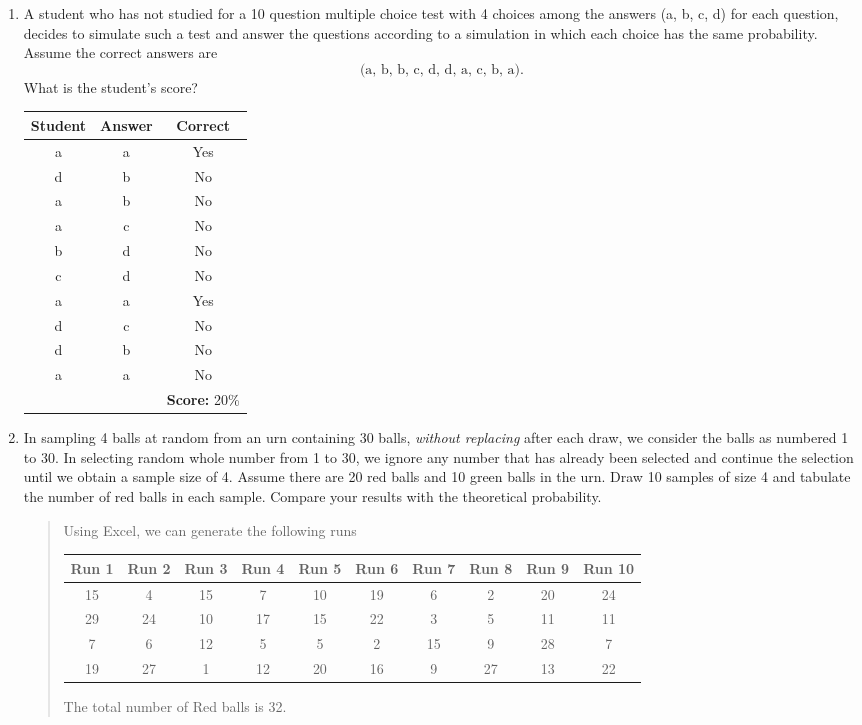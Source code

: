 \documentclass{hw}
\begin{document}
\begin{enumerate}
\newpage
\item A student who has not studied for a 10 question multiple choice test with 4 choices among the answers
(a, b, c, d) for each question, decides to simulate such a test and answer the questions according to a
simulation in which each choice has the same probability. Assume the correct answers are
\[\text{(a, b, b, c, d, d, a, c, b, a).}\]
What is the student's score?
\begin{center}
\begin{tabular}{c | c | c}
Student & Answer & Correct\\
\hline
a & a & Yes\\
d & b & No\\
a & b & No\\
a & c & No\\
b & d & No\\
c & d & No\\
a & a & Yes\\
d & c & No\\
d & b & No\\
a & a & No\\
\hline
& & \textbf{Score:} 20\%
\end{tabular}
\end{center}

\item In sampling 4 balls at random from an urn containing 30 balls, \textit{without replacing} after each
draw, we consider the balls as numbered 1 to 30. In selecting random whole number from 1 to 30, we ignore
any number that has already been selected and continue the selection until we obtain a sample size of 4.
Assume there are 20 red balls and 10 green balls in the urn. Draw 10 samples of size 4 and tabulate the
number of red balls in each sample. Compare your results with the theoretical probability.
\begin{quote}
Using Excel, we can generate the following runs
\begin{center}
\begin{tabular}{c | c | c | c | c | c | c | c | c | c}
Run 1 & Run 2 & Run 3 & Run 4 & Run 5 & Run 6 & Run 7 & Run 8 & Run 9 & Run 10\\
\hline
15 & 4 & 15 & 7 & 10 & 19 & 6 & 2 & 20 & 24\\
29 & 24 & 10 & 17 & 15 & 22 & 3 & 5 & 11 & 11\\
7 & 6 & 12 & 5 & 5 & 2 & 15 & 9 & 28 & 7\\
19 & 27 & 1 & 12 & 20 & 16 & 9 & 27 & 13 & 22
\end{tabular}
\end{center}
The total number of Red balls is 32.
\end{quote}


\end{enumerate}
\end{document}
